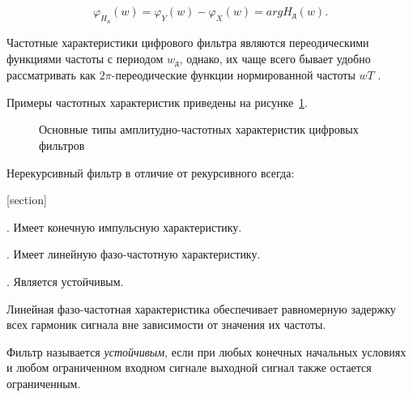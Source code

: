 \begin{equation}
	\varphi_{H_{\text{д}}} (w) = \varphi_Y(w) - \varphi_X(w) = arg H_{\text{д}}(w).
	\label{lab3_eq:phase_response}
\end{equation}

Частотные характеристики цифрового фильтра являются переодическими функциями частоты с периодом $w_{\text{д}}$, однако, их чаще всего бывает удобно рассматривать как $2\pi$-переодические функции нормированной частоты $wT$ \cite{RadioChains}.

Примеры частотных характеристик приведены на рисунке~\ref{lab3_fig:types}.

\begin{figure}
	\centering
	\scalebox{.85}{}
	\caption{Основные типы амплитудно-частотных характеристик цифровых фильтров}
	\label{lab3_fig:types}
\end{figure}

Нерекурсивный фильтр в отличие от рекурсивного всегда:

[section]

\setcounter{c}{1} . Имеет конечную импульсную характеристику.\par
\setcounter{c}{2} . Имеет линейную фазо-частотную характеристику.\par
\setcounter{c}{3} . Является устойчивым.\par

Линейная фазо-частотная характеристика обеспечивает равномерную задержку всех гармоник сигнала вне зависимости от значения их частоты.

Фильтр называется \emph{устойчивым}, если при любых конечных начальных условиях и любом ограниченном входном сигнале выходной сигнал также остается ограниченным.
